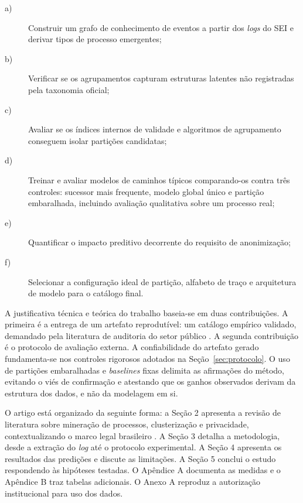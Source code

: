 \begin{description}
  \item[a)] Construir um grafo de conhecimento de eventos a partir dos \emph{logs} do SEI e derivar tipos de processo emergentes;
  \item[b)] Verificar se os agrupamentos capturam estruturas latentes não registradas pela taxonomia oficial;
  \item[c)] Avaliar se os índices internos de validade e algoritmos de agrupamento conseguem isolar partições candidatas;
  \item[d)] Treinar e avaliar modelos de caminhos típicos comparando-os contra três controles: sucessor mais frequente, modelo global único e partição embaralhada, incluindo avaliação qualitativa sobre um processo real;
  \item[e)] Quantificar o impacto preditivo decorrente do requisito de anonimização;
  \item[f)] Selecionar a configuração ideal de partição, alfabeto de traço e arquitetura de modelo para o catálogo final.
\end{description}

A justificativa técnica e teórica do trabalho baseia-se em duas contribuições. A primeira é a entrega de um artefato reprodutível: um catálogo empírico validado, demandado pela literatura de auditoria do setor público \cite{vanderaalst2010auditing,nai2026procurement,araujo2023mineracao,limaesilva2026analise}. A segunda contribuição é o protocolo de avaliação externa. A confiabilidade do artefato gerado fundamenta-se nos controles rigorosos adotados na Seção~\ref{sec:protocolo}. O uso de partições embaralhadas e \emph{baselines} fixas delimita as afirmações do método, evitando o viés de confirmação e atestando que os ganhos observados derivam da estrutura dos dados, e não da modelagem em si.

O artigo está organizado da seguinte forma: a Seção 2 apresenta a revisão de literatura sobre mineração de processos, clusterização e privacidade, contextualizando o marco legal brasileiro \cite{vanderaalst2016processmining,song2009trace,brasil1988cf,state2016procedurelaw,brasil2018lgpd}. A Seção 3 detalha a metodologia, desde a extração do \emph{log} até o protocolo experimental. A Seção 4 apresenta os resultados das predições e discute as limitações. A Seção 5 conclui o estudo respondendo às hipóteses testadas. O Apêndice A documenta as medidas e o Apêndice B traz tabelas adicionais. O Anexo A reproduz a autorização institucional para uso dos dados.